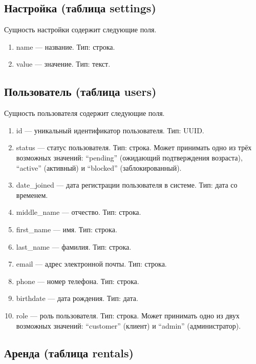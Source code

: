 \subsection{Настройка (таблица settings)}

Сущность настройки содержит следующие поля.

\begin{enumerate}
	\item name --- название. Тип: строка.
	\item value --- значение. Тип: текст.
\end{enumerate}

\subsection{Пользователь (таблица users)}

Сущность пользователя содержит следующие поля.

\begin{enumerate}
	\item id --- уникальный идентификатор пользователя. Тип: UUID.
	\item status --- статус пользователя. Тип: строка. Может принимать одно из трёх
	      возможных значений: \enquote{pending} (ожидающий подтверждения возраста),
	      \enquote{active} (активный) и \enquote{blocked} (заблокированный).
	\item date\_joined --- дата регистрации пользователя в системе. Тип: дата со
	      временем.
	\item middle\_name --- отчество. Тип: строка.
	\item first\_name --- имя. Тип: строка.
	\item last\_name --- фамилия. Тип: строка.
	\item email --- адрес электронной почты. Тип: строка.
	\item phone --- номер телефона. Тип: строка.
	\item birthdate --- дата рождения. Тип: дата.
	\item role --- роль пользователя. Тип: строка. Может принимать одно из двух возможных
	      значений: \enquote{customer} (клиент) и \enquote{admin} (администратор).
\end{enumerate}

\subsection{Аренда (таблица rentals)}

